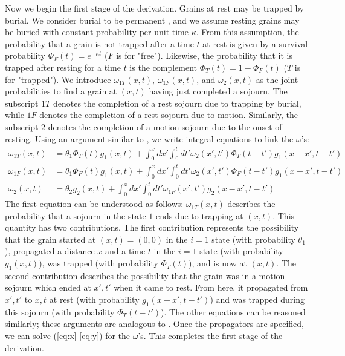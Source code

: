 \documentclass[]{agujournal2018}
\newcommand\om{\omega}
\begin{document}
Now we begin the first stage of the derivation.
Grains at rest may be trapped by burial.
We consider burial to be permanent \citep[e.g.][]{Wu2019}, and we assume resting grains may be buried with constant probability per unit time $\kappa$.
From this assumption, the probability that a grain is not trapped after a time $t$ at rest is given by a survival probability $\Phi_F(t) = e^{-\kappa t}$ ($F$ is for "free"). Likewise, the probability that it is trapped after resting for a time $t$ is the complement $\Phi_T(t) = 1-\Phi_F(t)$ ($T$ is for "trapped").
We introduce $\omega_{1T}(x,t)$, $\omega_{1F}(x,t)$, and $\omega_2(x,t)$ as the joint probabilities to find a grain at $(x,t)$ having just completed a sojourn.
The subscript ${1T}$ denotes the completion of a rest sojourn due to trapping by burial, while $1F$ denotes the completion of a rest sojourn due to motion.
Similarly, the subscript $2$ denotes the completion of a motion sojourn due to the onset of resting.
Using an argument similar to \citet{Weiss1994}, we write integral equations to link the $\omega$'s: 
\begin{align}
\om_{1T}(x,t) &= \theta_1\Phi_T(t)g_1(x,t) + \int_0^x dx' \int_0^t dt' \om_2(x',t')\Phi_T(t-t')g_1(x-x',t-t')\label{eq:x}\\
\om_{1F}(x,t) &= \theta_1\Phi_F(t)g_1(x,t) + \int_0^x dx' \int_0^t dt' \om_2(x',t') \Phi_F(t-t') g_1(x-x',t-t')\\
\om_2(x,t) &= \theta_2 g_2(x,t) + \int_0^x dx' \int_0^t dt' \om_{1F}(x',t')g_2(x-x',t-t') \label{eq:y}
\end{align}
The first equation can be understood as follows: $\omega_{1T}(x,t)$ describes the probability that a sojourn in the state $1$ ends due to trapping at $(x,t)$. This quantity has two contributions. The first contribution represents the possibility that the grain started at $(x,t)=(0,0)$ in the $i=1$ state (with probability $\theta_1$), propagated a distance $x$ and a time $t$ in the $i=1$ state (with probability $g_1(x,t)$), was trapped (with probability $\Phi_T(t)$), and is now at $(x,t)$. 
The second contribution describes the possibility that the grain was in a motion sojourn which ended at $x',t'$ when it came to rest. From here, it propagated from $x',t'$ to $x,t$ at rest (with probability $g_1(x-x',t-t')$) and was trapped during this sojourn (with probability $\Phi_T(t-t')$).
The other equations can be reasoned similarly; these arguments are analogous to \citet{Weiss1994}.
Once the propagators are specified, we can solve (\ref{eq:x}-\ref{eq:y}) for the $\omega$'s. This completes the first stage of the derivation.
\end{document}
